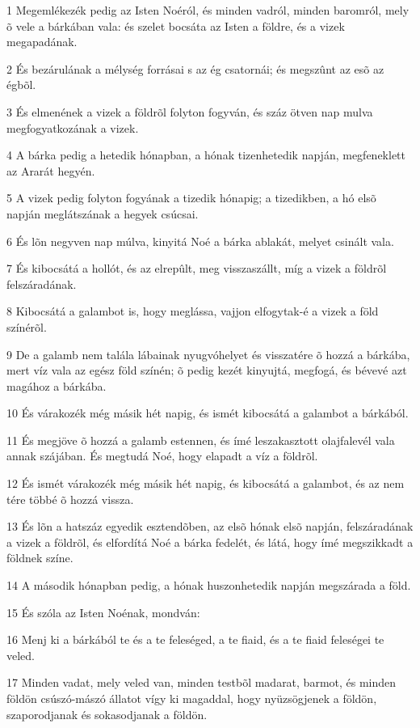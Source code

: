\par 1 Megemlékezék pedig az Isten Noéról, és minden vadról, minden baromról, mely õ vele a bárkában vala: és szelet bocsáta az Isten a földre, és a vizek megapadának.
\par 2 És bezárulának a mélység forrásai s az ég csatornái; és megszûnt az esõ az égbõl.
\par 3 És elmenének a vizek a földrõl folyton fogyván, és száz ötven nap mulva megfogyatkozának a vizek.
\par 4 A bárka pedig a hetedik hónapban, a hónak tizenhetedik napján, megfeneklett az Ararát hegyén.
\par 5 A vizek pedig folyton fogyának a tizedik hónapig; a tizedikben, a hó elsõ napján meglátszának a hegyek csúcsai.
\par 6 És lõn negyven nap múlva, kinyitá Noé a bárka ablakát, melyet csinált vala.
\par 7 És kibocsátá a hollót, és az elrepûlt, meg visszaszállt, míg a vizek a földrõl felszáradának.
\par 8 Kibocsátá a galambot is, hogy meglássa, vajjon elfogytak-é a vizek a föld színérõl.
\par 9 De a galamb nem talála lábainak nyugvóhelyet és visszatére õ hozzá a bárkába, mert víz vala az egész föld színén; õ pedig kezét kinyujtá, megfogá, és bévevé azt magához a bárkába.
\par 10 És várakozék még másik hét napig, és ismét kibocsátá a galambot a bárkából.
\par 11 És megjöve õ hozzá a galamb estennen, és ímé leszakasztott olajfalevél vala annak szájában. És megtudá Noé, hogy elapadt a víz a földrõl.
\par 12 És ismét várakozék még másik hét napig, és kibocsátá a galambot, és az nem tére többé õ hozzá vissza.
\par 13 És lõn a hatszáz egyedik esztendõben, az elsõ hónak elsõ napján, felszáradának a vizek a földrõl, és elfordítá Noé a bárka fedelét, és látá, hogy ímé megszikkadt a földnek színe.
\par 14 A második hónapban pedig, a hónak huszonhetedik napján megszárada a föld.
\par 15 És szóla az Isten Noénak, mondván:
\par 16 Menj ki a bárkából te és a te feleséged, a te fiaid, és a te fiaid feleségei te veled.
\par 17 Minden vadat, mely veled van, minden testbõl madarat, barmot, és minden földön csúszó-mászó állatot vígy ki magaddal, hogy nyüzsögjenek a földön, szaporodjanak és sokasodjanak a földön.
